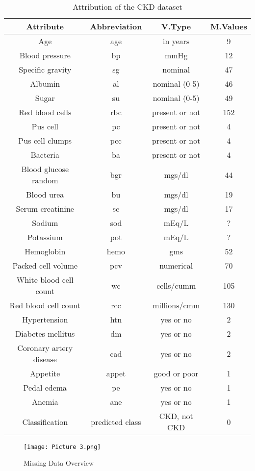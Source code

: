 \documentclass[conference]{IEEEtran}
\begin{document}
\begin{table}[htbp]
\caption{Attribution of the CKD dataset}
\begin{center}
\begin{tabular}{|c|c|c|c|}
\hline
\textbf{Attribute} & \textbf{Abbreviation} & \textbf{V.Type} & \textbf{M.Values} \\
\hline
Age & age & in years & 9 \\
Blood pressure & bp & mmHg & 12 \\
Specific gravity & sg & nominal & 47 \\
Albumin & al & nominal (0-5) & 46 \\
Sugar & su & nominal (0-5) & 49 \\
Red blood cells & rbc & present or not & 152 \\
Pus cell & pc & present or not & 4 \\
Pus cell clumps & pcc & present or not & 4 \\
Bacteria & ba & present or not & 4 \\
Blood glucose random & bgr & mgs/dl & 44 \\
Blood urea & bu & mgs/dl & 19 \\
Serum creatinine & sc & mgs/dl & 17 \\
Sodium & sod & mEq/L & ? \\
Potassium & pot & mEq/L & ? \\
Hemoglobin & hemo & gms & 52 \\
Packed cell volume & pcv & numerical & 70 \\
White blood cell count & wc & cells/cumm & 105 \\
Red blood cell count & rcc & millions/cmm & 130 \\
Hypertension & htn & yes or no & 2 \\
Diabetes mellitus & dm & yes or no & 2 \\
Coronary artery disease & cad & yes or no & 2 \\
Appetite & appet & good or poor & 1 \\
Pedal edema & pe & yes or no & 1 \\
Anemia & ane & yes or no & 1 \\
Classification & predicted class & CKD, not CKD & 0 \\
\hline
\end{tabular}
\label{tab1}
\end{center}
\end{table}

\begin{figure}[htbp]
    \centering
    \texttt{[image: Picture 3.png]}
    \caption{Missing Data Overview} 
    \label{fig2}
\end{figure}
\end{document}
